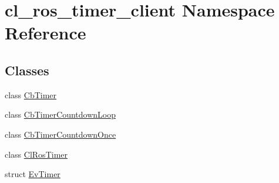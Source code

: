 \hypertarget{namespacecl__ros__timer__client}{}\section{cl\+\_\+ros\+\_\+timer\+\_\+client Namespace Reference}
\label{namespacecl__ros__timer__client}
\subsection*{Classes}
\begin{DoxyCompactItemize}
\item 
class \hyperlink{classcl__ros__timer__client_1_1CbTimer}{Cb\+Timer}
\item 
class \hyperlink{classcl__ros__timer__client_1_1CbTimerCountdownLoop}{Cb\+Timer\+Countdown\+Loop}
\item 
class \hyperlink{classcl__ros__timer__client_1_1CbTimerCountdownOnce}{Cb\+Timer\+Countdown\+Once}
\item 
class \hyperlink{classcl__ros__timer__client_1_1ClRosTimer}{Cl\+Ros\+Timer}
\item 
struct \hyperlink{structcl__ros__timer__client_1_1EvTimer}{Ev\+Timer}
\end{DoxyCompactItemize}
